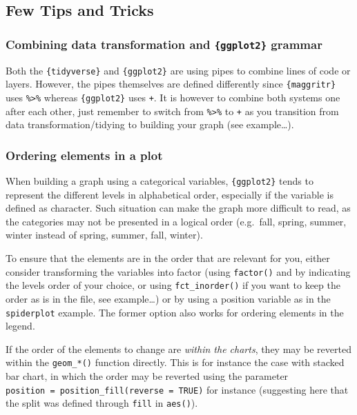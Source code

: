 \documentclass[
]{book}
\begin{document}
\hypertarget{few-tips-and-tricks}{%
\subsection{Few Tips and Tricks}\label{few-tips-and-tricks}}

\hypertarget{combining-data-transformation-and-ggplot2-grammar}{%
\subsubsection{\texorpdfstring{Combining data transformation and \texttt{\{ggplot2\}} grammar}{Combining data transformation and \{ggplot2\} grammar}}\label{combining-data-transformation-and-ggplot2-grammar}}

Both the \texttt{\{tidyverse\}} and \texttt{\{ggplot2\}} are using pipes to combine lines of code or layers.
However, the pipes themselves are defined differently since \texttt{\{maggritr\}} uses \texttt{\%\textgreater{}\%} whereas \texttt{\{ggplot2\}} uses \texttt{+}.
It is however to combine both systems one after each other, just remember to switch from \texttt{\%\textgreater{}\%} to \texttt{+} as you transition from data transformation/tidying to building your graph (see example\ldots).

\hypertarget{ordering-elements-in-a-plot}{%
\subsubsection{Ordering elements in a plot}\label{ordering-elements-in-a-plot}}

When building a graph using a categorical variables, \texttt{\{ggplot2\}} tends to represent the different levels in alphabetical order, especially if the variable is defined as character. Such situation can make the graph more difficult to read, as the categories may not be presented in a logical order (e.g.~fall, spring, summer, winter instead of spring, summer, fall, winter).

To ensure that the elements are in the order that are relevant for you, either consider transforming the variables into factor (using \texttt{factor()} and by indicating the levels order of your choice, or using \texttt{fct\_inorder()} if you want to keep the order as is in the file, see example\ldots) or by using a position variable as in the \texttt{spiderplot} example. The former option also works for ordering elements in the legend.

If the order of the elements to change are \emph{within the charts}, they may be reverted within the \texttt{geom\_*()} function directly. This is for instance the case with stacked bar chart, in which the order may be reverted using the parameter \texttt{position\ =\ position\_fill(reverse\ =\ TRUE)} for instance (suggesting here that the split was defined through \texttt{fill} in \texttt{aes()}).
\end{document}

